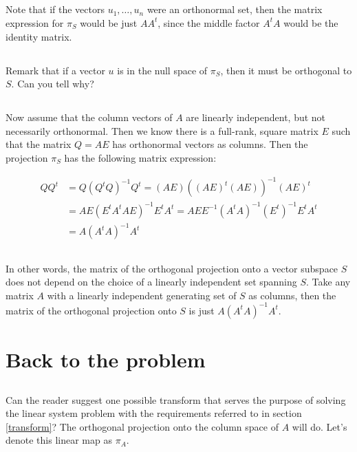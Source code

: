 \documentclass{proc-l}
\theoremstyle{definition}
\theoremstyle{remark}
\numberwithin{equation}{section}
\begin{document}
\subsection{}
Note that if the vectors $u_1, \ldots, u_n$ were an orthonormal set, then the matrix expression for $\pi_S$ would be just $AA^t$, since the middle factor $A^tA$ would be the identity matrix.

\subsection{}\label{null-remark}
Remark that if a vector $u$ is in the null space of $\pi_S$, then it must be orthogonal to $S$. Can you tell why?

\subsection{}
Now assume that the column vectors of $A$ are linearly independent, but not necessarily orthonormal. Then we know there is a full-rank, square matrix $E$ such that the matrix $Q=AE$ has orthonormal vectors as columns. Then the projection $\pi_S$ has the following matrix expression:

\begin{align*}
QQ^t & = Q(Q^tQ)^{-1}Q^t = (AE)((AE)^t(AE))^{-1}(AE)^t\\ 
&= AE(E^tA^tAE)^{-1}E^tA^t = AEE^{-1}(A^t A)^{-1}(E^t)^{-1}E^tA^t\\ 
&= A(A^tA)^{-1}A^t
\end{align*}

\subsection{}
In other words, the matrix of the orthogonal projection onto a vector subspace $S$ does not depend on the choice of a linearly independent set spanning $S$. Take any matrix $A$ with a linearly independent generating set of $S$ as columns, then the matrix of the orthogonal projection onto $S$ is just $A(A^tA)^{-1}A^t$.

\section{Back to the problem}

\subsection{}
Can the reader suggest one possible transform that serves the purpose of solving the linear system problem with the requirements referred to in section \ref{transform}? The orthogonal projection onto the column space of $A$ will do. Let's denote this linear map as $\pi_A$.
\end{document}
